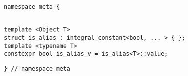 
\begin{verbatim}
namespace meta {
\end{verbatim}
\begin{verbatim}

template <Object T>
struct is_alias : integral_constant<bool, ... > { };
template <typename T>
constexpr bool is_alias_v = is_alias<T>::value;

\end{verbatim}
\begin{verbatim}
} // namespace meta
\end{verbatim}
